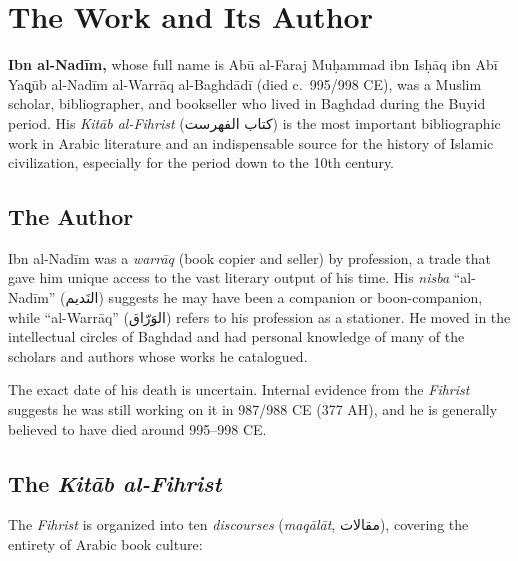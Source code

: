 \documentclass[11pt,a4paper]{article}
\newcommand{\ar}[1]{{\arabicfont\beginR #1\endR}}
\begin{document}
\newpage

\section{The Work and Its Author}

\noindent\textbf{Ibn al-Nad\=im,} whose full name is Ab\=u al-Faraj Mu\d{h}ammad
ibn Is\d{h}\=aq ibn Ab\=i Ya\c{q}\=ub al-Nad\=im al-Warr\=aq al-Baghd\=ad\=i
(died c.~995/998 CE), was a Muslim scholar, bibliographer, and bookseller
who lived in Baghdad during the Buyid period. His
\textit{Kit\=ab al-Fihrist} (\ar{كتاب الفهرست}) is the most
important bibliographic work in Arabic literature and an indispensable
source for the history of Islamic civilization, especially for the period
down to the 10th century.

\subsection{The Author}

Ibn al-Nad\=im was a \textit{warr\=aq} (book copier and seller) by
profession, a trade that gave him unique access to the vast literary
output of his time. His \textit{nisba} ``al-Nad\=im'' (\ar{النَديم})
suggests he may have been a companion or boon-companion, while
``al-Warr\=aq'' (\ar{الوَرّاق}) refers to his profession as a
stationer. He moved in the intellectual circles of Baghdad and had
personal knowledge of many of the scholars and authors whose works he
catalogued.

The exact date of his death is uncertain. Internal evidence from the
\textit{Fihrist} suggests he was still working on it in 987/988 CE
(377 AH), and he is generally believed to have died around 995--998 CE.

\subsection{The \textit{Kit\=ab al-Fihrist}}

The \textit{Fihrist} is organized into ten \textit{discourses}
(\textit{maq\=al\=at}, \ar{مقالات}), covering the entirety of Arabic
book culture:
\end{document}
